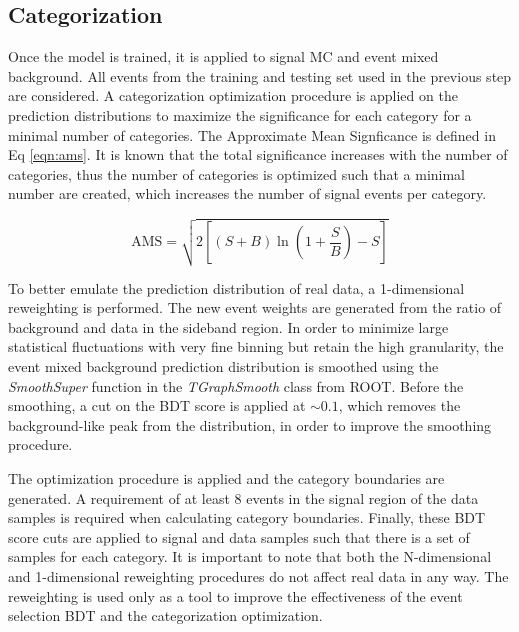 \documentclass[12pt]{article}
\begin{document}
\subsection{Categorization}
Once the model is trained, it is applied to signal MC and event mixed background. All events from the training and testing set used in the previous step are considered. A categorization optimization procedure is applied on the prediction distributions to maximize the significance for each category for a minimal number of categories. The Approximate Mean Signficance is defined in Eq \ref{eqn:ams}. It is known that the total significance increases with the number of categories, thus the number of categories is optimized such that a minimal number are created, which increases the number of signal events per category.\par

\begin{equation} \label{eqn:ams}
\text{AMS} = \sqrt{2 \left[ (S + B) \ln \left(1 + \frac{S}{B}\right) - S \right]}
\end{equation}

To better emulate the prediction distribution of real data, a 1-dimensional reweighting is performed. The new event weights are generated from the ratio of background and data in the sideband region. In order to minimize large statistical fluctuations with very fine binning but retain the high granularity, the event mixed background prediction distribution is smoothed using the \textit{SmoothSuper} function in the \textit{TGraphSmooth} class from ROOT. Before the smoothing, a cut on the BDT score is applied at $\sim 0.1$, which removes the background-like peak from the distribution, in order to improve the smoothing procedure.\par

The optimization procedure is applied and the category boundaries are generated. A requirement of at least 8 events in the signal region of the data samples is required when calculating category boundaries.
Finally, these BDT score cuts are applied to signal and data samples such that there is a set of samples for each category. It is important to note that both the N-dimensional and 1-dimensional reweighting procedures do not affect real data in any way. The reweighting is used only as a tool to improve the effectiveness of the event selection BDT and the categorization optimization.\par
\end{document}
